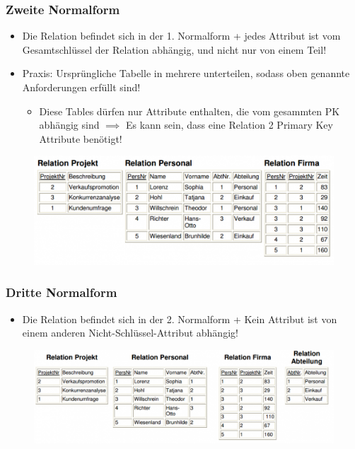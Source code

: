 \subsubsection{Zweite Normalform}
\begin{itemize}
    \item Die Relation befindet sich in der 1. Normalform + jedes Attribut ist vom Gesamtschlüssel der Relation abhängig, und nicht nur von einem Teil!
    \item Praxis: Ursprüngliche Tabelle in mehrere unterteilen, sodass oben genannte Anforderungen erfüllt sind!
    \begin{itemize}
        \item Diese Tables dürfen nur Attribute enthalten, die vom gesammten PK abhängig sind $\implies$ Es kann sein, dass eine Relation 2 Primary Key Attribute benötigt!
    \end{itemize}
\end{itemize}
\begin{figure}[H]
    \centering
    \includegraphics[width=\textwidth]{res/themenkorb_3/normalization_pic3.png}
\end{figure}
\subsubsection{Dritte Normalform}
\begin{itemize}
    \item Die Relation befindet sich in der 2. Normalform + Kein Attribut ist von einem anderen Nicht-Schlüssel-Attribut abhängig!
\end{itemize}
\begin{figure}[H]
    \centering
    \includegraphics[width=\textwidth]{res/themenkorb_3/normalization_pic6.png}
\end{figure}

